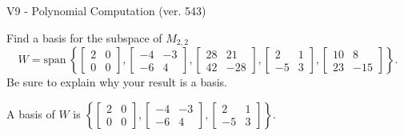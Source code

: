 \begin{exercise}
  \begin{exerciseTitle}V9 - Polynomial Computation (ver. 543)\end{exerciseTitle}
  \begin{exerciseStatement}
    Find a basis for the subspace of \(M_{2,2}\) 
\[W=\mathrm{span}\ \left\{\left[\begin{array}{cc}
2 & 0 \\
0 & 0
\end{array}\right] , \left[\begin{array}{cc}
-4 & -3 \\
-6 & 4
\end{array}\right] , \left[\begin{array}{cc}
28 & 21 \\
42 & -28
\end{array}\right] , \left[\begin{array}{cc}
2 & 1 \\
-5 & 3
\end{array}\right] , \left[\begin{array}{cc}
10 & 8 \\
23 & -15
\end{array}\right]\right\}.\]
 Be sure to explain why your result is a basis.


  \end{exerciseStatement}
  \begin{exerciseAnswer}
   A basis of \(W\) is  \(\left\{\left[\begin{array}{cc}
2 & 0 \\
0 & 0
\end{array}\right] , \left[\begin{array}{cc}
-4 & -3 \\
-6 & 4
\end{array}\right] , \left[\begin{array}{cc}
2 & 1 \\
-5 & 3
\end{array}\right]\right\}\).
  


  \end{exerciseAnswer}
\end{exercise}